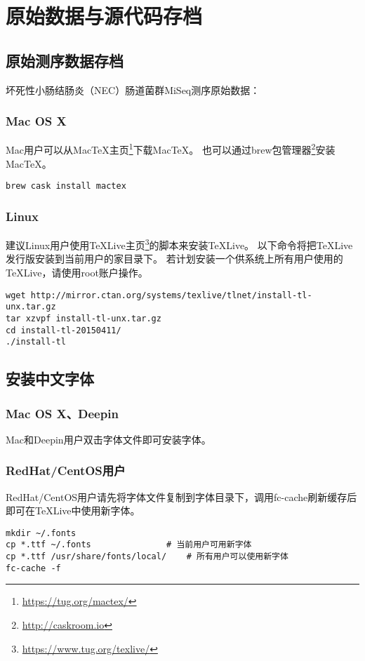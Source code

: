 \chapter{原始数据与源代码存档}

\section{原始测序数据存档}
坏死性小肠结肠炎（NEC）肠道菌群MiSeq测序原始数据：


\subsection{Mac OS X}

Mac用户可以从MacTeX主页\footnote{\url{https://tug.org/mactex/}}下载MacTeX。
也可以通过brew包管理器\footnote{\url{http://caskroom.io}}安装MacTeX。

\begin{lstlisting}[basicstyle=\small\ttfamily, numbers=none]
brew cask install mactex
\end{lstlisting}

\subsection{Linux}

建议Linux用户使用TeXLive主页\footnote{\url{https://www.tug.org/texlive/}}的脚本来安装TeXLive。
以下命令将把TeXLive发行版安装到当前用户的家目录下。
若计划安装一个供系统上所有用户使用的TeXLive，请使用root账户操作。

\begin{lstlisting}[basicstyle=\small\ttfamily, numbers=none]
wget http://mirror.ctan.org/systems/texlive/tlnet/install-tl-unx.tar.gz
tar xzvpf install-tl-unx.tar.gz
cd install-tl-20150411/
./install-tl
\end{lstlisting}

\section{安装中文字体}

\subsection{Mac OS X、Deepin}

Mac和Deepin用户双击字体文件即可安装字体。

\subsection{RedHat/CentOS用户}

RedHat/CentOS用户请先将字体文件复制到字体目录下，调用fc-cache刷新缓存后即可在TeXLive中使用新字体。

\begin{lstlisting}[basicstyle=\small\ttfamily, numbers=none]
mkdir ~/.fonts
cp *.ttf ~/.fonts				# 当前用户可用新字体
cp *.ttf /usr/share/fonts/local/	# 所有用户可以使用新字体
fc-cache -f
\end{lstlisting}
